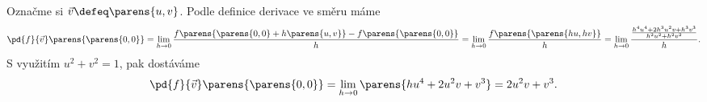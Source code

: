\documentclass[answers]{exam}
\begin{document}
\begin{questions}
 	\begin{solution}
 	Označme si $\vec{v} \defeq \parens{u, v}$. Podle definice derivace ve směru máme
 	\begin{equation*}
 		\pd{f}{\vec{v}}\parens{\parens{0, 0}}
 		=
 		\lim_{h \to 0} \frac{f\parens{\parens{0,0} + h \parens{u, v}} - f\parens{\parens{0,0}}}{h}
 		=
 		\lim_{h \to 0} \frac{f\parens{\parens{hu, hv}}}{h}
 		=
 		\lim_{h \to 0} \frac{\frac{h^4 u^4 + 2h^3 u^2 v + h^3 v^3}{h^2 u^2 + h^2 v^2}}{h}.
 	\end{equation*}
 	S využitím $u^2 + v^2 = 1$, pak dostáváme
 	\begin{equation*}
 		\pd{f}{\vec{v}}\parens{\parens{0, 0}}
 		=
 		\lim_{h \to 0}
 		\parens{h u^4 + 2 u^2 v + v^3}
 		=
 		2 u^2 v + v^3.
 	\end{equation*}
 	\end{solution}
  
\end{questions}
\end{document}
